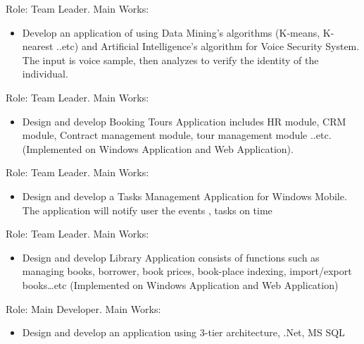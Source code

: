 \documentclass[11pt,a4paper,sans]{moderncv/moderncv}        %
\begin{document}

{Role: Team Leader.\newline{}%
Main Works:%
\begin{itemize}%
 \item Develop an application of using Data Mining’s algorithms (K-means, K-nearest ..etc) and Artificial Intelligence's algorithm for Voice Security System. The input is voice sample, then analyzes to verify the identity of the individual.
\end{itemize}}

{Role: Team Leader.\newline{}%
Main Works:%
\begin{itemize}%
 \item Design and develop Booking Tours Application includes HR module, CRM module, Contract management module, tour management module ..etc. (Implemented on Windows Application and Web Application).
\end{itemize}}

{Role: Team Leader.\newline{}%
Main Works:%
\begin{itemize}%
 \item Design and develop a Tasks Management Application for Windows Mobile. The application will notify user the events , tasks on time 
\end{itemize}}

{Role: Team Leader.\newline{}%
Main Works:%
\begin{itemize}%
 \item Design and develop Library Application consists of functions such as managing books, borrower, book prices, book-place indexing, import/export books…etc (Implemented on Windows Application and Web Application) 
\end{itemize}}

{Role: Main Developer.\newline{}%
Main Works:%
\begin{itemize}%
 \item Design and develop an application using 3-tier architecture, .Net, MS SQL 
\end{itemize}}
\end{document}
